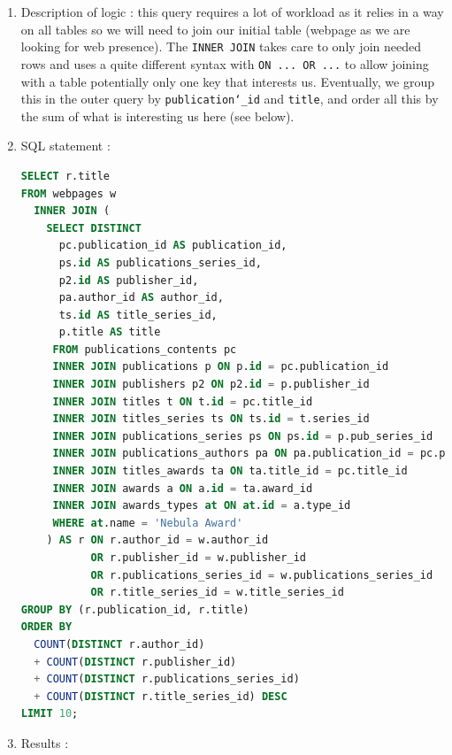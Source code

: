\documentclass[doubleside, titlepage]{article}
\begin{document}
	\begin{enumerate}
	\item Description of logic : this query requires a lot of workload as it relies in a way on all tables so we will need to join our initial table (webpage as we are looking for web presence). The \texttt{INNER JOIN} takes care to only join needed rows and uses a quite different syntax with \texttt{ON ... OR ...} to allow joining with a table potentially only one key that interests us. Eventually, we group this in the outer query by \texttt{publication\char`_id} and \texttt{title}, and order all this by the sum of what is interesting us here (see below).
	\item SQL statement :
		\begin{lstlisting}[language=SQL,showspaces=false,basicstyle=\ttfamily,numberstyle=\tiny,commentstyle=\color{gray}]
SELECT r.title
FROM webpages w
  INNER JOIN (
    SELECT DISTINCT
      pc.publication_id AS publication_id,
      ps.id AS publications_series_id,
      p2.id AS publisher_id,
      pa.author_id AS author_id,
      ts.id AS title_series_id,
      p.title AS title
     FROM publications_contents pc
     INNER JOIN publications p ON p.id = pc.publication_id
     INNER JOIN publishers p2 ON p2.id = p.publisher_id
     INNER JOIN titles t ON t.id = pc.title_id
     INNER JOIN titles_series ts ON ts.id = t.series_id
     INNER JOIN publications_series ps ON ps.id = p.pub_series_id
     INNER JOIN publications_authors pa ON pa.publication_id = pc.publication_id
     INNER JOIN titles_awards ta ON ta.title_id = pc.title_id
     INNER JOIN awards a ON a.id = ta.award_id
     INNER JOIN awards_types at ON at.id = a.type_id
     WHERE at.name = 'Nebula Award'
    ) AS r ON r.author_id = w.author_id
           OR r.publisher_id = w.publisher_id
           OR r.publications_series_id = w.publications_series_id
           OR r.title_series_id = w.title_series_id
GROUP BY (r.publication_id, r.title)
ORDER BY
  COUNT(DISTINCT r.author_id)
  + COUNT(DISTINCT r.publisher_id)
  + COUNT(DISTINCT r.publications_series_id)
  + COUNT(DISTINCT r.title_series_id) DESC
LIMIT 10;
		\end{lstlisting}

	\item Results :\\


\end{enumerate}
\end{document}
